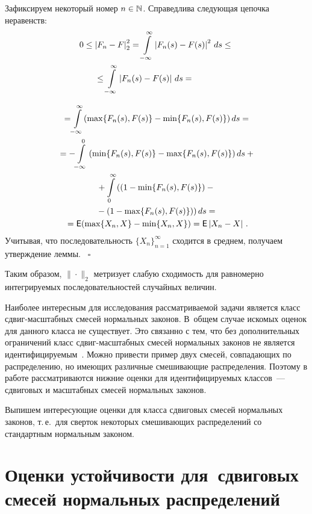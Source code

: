 \begin{multicols}{2}
Зафиксируем некоторый номер $n\hm\in\mathbb{N}$. 
Справедлива следующая цепочка неравенств:
\begin{multline*}
0\le\left\vert F_n - F  \right\vert^2_{2} =
\int\limits_{-\infty}^{\infty} \left\vert F_n(s) - F (s)\right\vert^2\, ds \le {}\\
{}\le
\int\limits_{-\infty}^{\infty} \left\vert F_n(s) - F (s)\right\vert\, ds ={}\hspace*{10mm}
\end{multline*}

\noindent
\begin{multline*}
{} = \!\int\limits_{-\infty}^{\infty}
 (\max\{F_n(s),F (s)\} - \min\{F_n(s),F (s)\})\, ds  ={}
\\{} =
 - \!\int\limits_{-\infty}^{0}\left(\min\{F_n(s),F (s)\} - \max\{F_n(s),F (s)\}  \right) ds
 +{}\\
{}+\int\limits_{0}^{\infty} \left( (1 - \min\{F_n(s),F (s)\})  -{}\right.\\
\left.{}- ( 1 -
\max\{F_n(s),F (s)\}  ) \right) ds ={}
\\
{}= {\sf E}( \max\{X_n,X\} -\min\{X_n,X\} ) = {\sf E} \left\vert X_n - X\right\vert\,.
\end{multline*}
Учитывая, что последовательность $\{X_n\}_{n=1}^\infty$ сходится в
среднем, получаем утверждение леммы. \hfill~$\square$


\medskip

Таким образом, $\|\cdot \|_2$ метризует слабую сходимость для
равномерно интегрируемых последовательностей случайных величин.

Наиболее интересным для исследования рассматриваемой задачи является
класс сдвиг-мас\-штаб\-ных смесей нормальных законов. В~общем случае
искомых оценок для данного класса не существует. Это связанно с тем,
что без дополнительных ограничений класс сдвиг-мас\-штаб\-ных смесей
нормальных законов не является идентифицируемым~\cite{KorolevChaos}.
Можно привести  пример двух смесей, совпадающих по распределению, но
имеющих различные смешивающие распределения.  Поэтому в работе
рассматриваются нижние оценки для идентифицируемых классов~---
сдвиговых и масштабных смесей нормальных законов.

Выпишем интересующие оценки для класса сдвиговых смесей нормальных
законов, т.\,е.\ для сверток некоторых смешивающих распределений со
стандартным нормальным законом.

\section{Оценки устойчивости для~сдвиговых смесей нормальных распределений}


\end{multicols}
